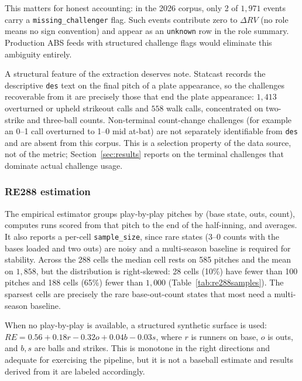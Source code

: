 This matters for honest accounting: in the 2026 corpus, only 2 of $1{,}971$
events carry a \texttt{missing\_challenger} flag. Such events contribute zero to
$\Delta RV$ (no role means no sign convention) and appear as an
\texttt{unknown} row in the role summary. Production ABS feeds with structured
challenge flags would eliminate this ambiguity entirely.

A structural feature of the extraction deserves note. Statcast records the
descriptive \texttt{des} text on the final pitch of a plate appearance, so the
challenges recoverable from it are precisely those that end the plate
appearance: $1{,}413$ overturned or upheld strikeout calls and $558$ walk
calls, concentrated on two-strike and three-ball counts. Non-terminal
count-change challenges (for example an 0--1 call overturned to 1--0 mid
at-bat) are not separately identifiable from \texttt{des} and are absent from
this corpus. This is a selection property of the data source, not of the metric;
Section~\ref{sec:results} reports on the terminal challenges that dominate
actual challenge usage.

\subsubsection{RE288 estimation}
The empirical estimator groups play-by-play pitches by
(base state, outs, count), computes runs scored from that pitch to the end of
the half-inning, and averages. It also reports a per-cell
\texttt{sample\_size}, since rare states (3--0 counts with the bases loaded
and two outs) are noisy and a multi-season baseline is required for stability.
Across the 288 cells the median cell rests on 585 pitches and the mean on
$1{,}858$, but the distribution is right-skewed: 28 cells (10\%) have fewer
than 100 pitches and 188 cells (65\%) fewer than $1{,}000$
(Table~\ref{tab:re288samples}). The sparsest cells are precisely the rare
base-out-count states that most need a multi-season baseline.



When no play-by-play is available, a structured synthetic surface is used:
$RE = 0.56 + 0.18r - 0.32o + 0.04b - 0.03s$, where $r$ is runners on base, $o$
is outs, and $b, s$ are balls and strikes. This is monotone in the right
directions and adequate for exercising the pipeline, but it is not a baseball
estimate and results derived from it are labeled accordingly.

